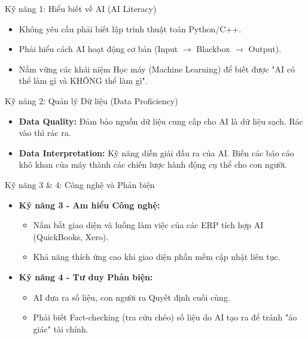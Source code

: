 \documentclass[aspectratio=169]{beamer}
\begin{document}
\begin{frame}{Kỹ năng 1: Hiểu biết về AI (AI Literacy)}
    \begin{itemize}
        \item Không yêu cầu phải biết lập trình thuật toán Python/C++.
        \item Phải hiểu cách AI hoạt động cơ bản (Input $\rightarrow$ Blackbox $\rightarrow$ Output).
        \item Nắm vững các khái niệm Học máy (Machine Learning) để biết được "AI có thể làm gì và KHÔNG thể làm gì".
    \end{itemize}
\end{frame}

\begin{frame}{Kỹ năng 2: Quản lý Dữ liệu (Data Proficiency)}
    \begin{itemize}
        \item \textbf{Data Quality:} Đảm bảo nguồn dữ liệu cung cấp cho AI là dữ liệu sạch. Rác vào thì rác ra.
        \item \textbf{Data Interpretation:} Kỹ năng diễn giải đầu ra của AI. Biến các báo cáo khô khan của máy thành các chiến lược hành động cụ thể cho con người.
    \end{itemize}
\end{frame}

\begin{frame}{Kỹ năng 3 \& 4: Công nghệ và Phản biện}
    \begin{itemize}
        \item \textbf{Kỹ năng 3 - Am hiểu Công nghệ:} 
        \begin{itemize}
            \item Nắm bắt giao diện và luồng làm việc của các ERP tích hợp AI (QuickBooks, Xero).
            \item Khả năng thích ứng cao khi giao diện phần mềm cập nhật liên tục.
        \end{itemize}
        \item \textbf{Kỹ năng 4 - Tư duy Phản biện:}
        \begin{itemize}
            \item AI đưa ra số liệu, con người ra Quyết định cuối cùng.
            \item Phải biết Fact-checking (tra cứu chéo) số liệu do AI tạo ra để tránh "ảo giác" tài chính.
        \end{itemize}
    \end{itemize}
\end{frame}
\end{document}

